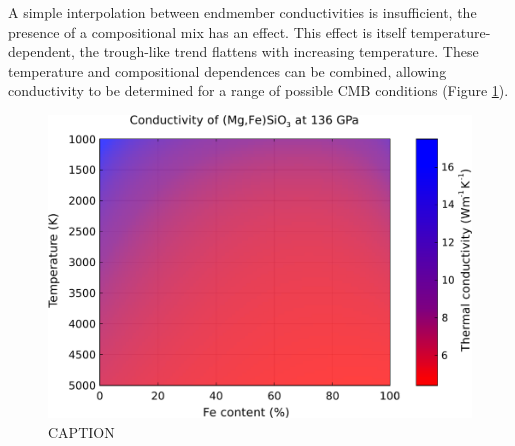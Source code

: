 A simple interpolation between endmember conductivities is insufficient, the presence of a compositional mix has an effect. This effect is itself temperature-dependent, the trough-like trend flattens with increasing temperature. These temperature and compositional dependences can be combined, allowing conductivity to be determined for a range of possible CMB conditions (Figure \ref{fig:kappa-temp-comp_01}). 

\begin{figure}[h!]
  \includegraphics[width=\linewidth]{Figures/K_over_T_over_X.png}
  \caption{CAPTION}
  \label{fig:kappa-temp-comp_01}
\end{figure}












\pagebreak